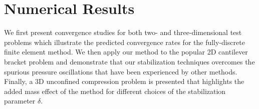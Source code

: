 
\section{Numerical Results}
\label{sec:results}
We first present convergence studies for both two- and three-dimensional test problems which illustrate the predicted convergence rates for the fully-discrete finite element method. We then apply our method to the popular 2D cantilever bracket problem and demonstrate that our stabilization techniques overcomes the spurious pressure oscillations that have been experienced by other methods. Finally, a 3D unconfined compression problem is presented that highlights the added mass effect of the method for different choices of the stabilization parameter $\delta$.

